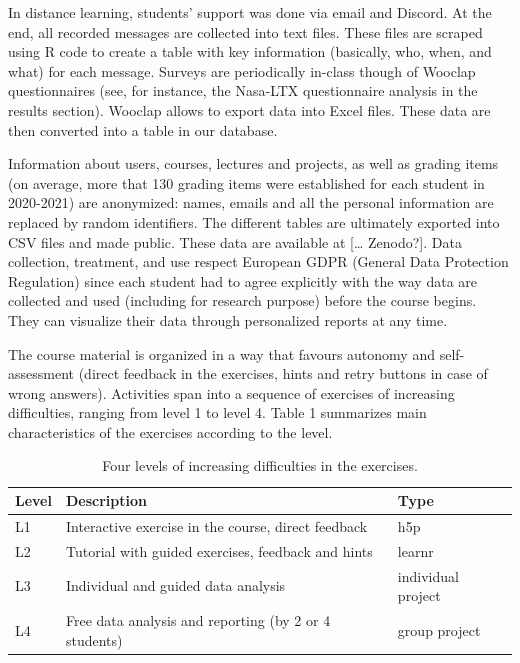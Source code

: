 \documentclass{aims}
\theoremstyle{definition}
\begin{document}
In distance learning, students' support was done via email and Discord.
At the end, all recorded messages are collected into text files. These
files are scraped using R code to create a table with key information
(basically, who, when, and what) for each message. Surveys are
periodically in-class though of Wooclap questionnaires (see, for
instance, the Nasa-LTX questionnaire analysis in the results section).
Wooclap allows to export data into Excel files. These data are then
converted into a table in our database.

Information about users, courses, lectures and projects, as well as
grading items (on average, more that 130 grading items were established
for each student in 2020-2021) are anonymized: names, emails and all the
personal information are replaced by random identifiers. The different
tables are ultimately exported into CSV files and made public. These
data are available at {[}\ldots{} Zenodo?{]}. Data collection,
treatment, and use respect European GDPR (General Data Protection
Regulation) since each student had to agree explicitly with the way data
are collected and used (including for research purpose) before the
course begins. They can visualize their data through personalized
reports at any time.

The course material is organized in a way that favours autonomy and
self-assessment (direct feedback in the exercises, hints and retry
buttons in case of wrong answers). Activities span into a sequence of
exercises of increasing difficulties, ranging from level 1 to level 4.
Table 1 summarizes main characteristics of the exercises according to
the level.

\begin{table}

\caption{\label{tab:tab_ex_levels_summary}\label{tab:tab_ex_levels} Four levels of increasing difficulties in the exercises.}
\centering
\begin{tabular}[t]{l|l|l}
\hline
Level & Description & Type\\
\hline
L1 & Interactive exercise in the course, direct feedback & h5p\\
\hline
L2 & Tutorial with guided exercises, feedback and hints & learnr\\
\hline
L3 & Individual and guided data analysis & individual project\\
\hline
L4 & Free data analysis and reporting (by 2 or 4 students) & group project\\
\hline
\end{tabular}
\end{table}
\end{document}
